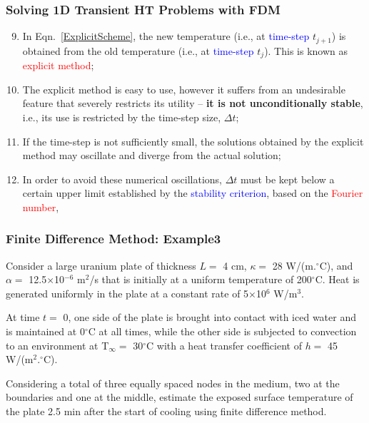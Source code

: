 \documentclass[10pt,compress,unknownkeysallowed]{beamer}
\newcommand{\frc}{\displaystyle\frac}
\newcommand{\red}{\textcolor{red}}
\newcommand{\blue}{\textcolor{blue}}
\begin{document}
\begin{frame}
  \frametitle{Solving 1D Transient HT Problems with FDM}
    \begin{enumerate}\setcounter{enumi}{8}
      \item<1-> In Eqn.~\ref{ExplicitScheme}, the new temperature (i.e., at \blue{time-step} $t_{j+1}$) is obtained from the old temperature  (i.e., at \blue{time-step} $t_{j}$). This is known as \red{explicit method}; 
      \item<2-> The explicit method is easy to use, however it suffers from an undesirable feature that severely restricts its utility -- {\bf it is not unconditionally stable}, i.e., its use is restricted by the time-step size, $\Delta t$;
      \item<3-> If the time-step is not sufficiently small, the solutions obtained by the explicit method may oscillate and diverge from the actual solution;
      \item<4-> In order to avoid these numerical oscillations, $\Delta t$ must be kept below a certain upper limit established by the \blue{stability criterion}, based on the \red{Fourier number},
           \visible<4->{\begin{equation}
               Fo = \frc{\alpha \Delta t}{\left(\Delta x\right)^{2}} \leq \frc{1}{2}
           \end{equation}} 

    \end{enumerate}
\end{frame}



\begin{frame}
   \frametitle{Finite Difference Method: Example3}
   Consider a large uranium plate of thickness $L=$ 4 cm, $\kappa =$ 28 W/(m.$^{\circ}$C), and $\alpha =$ 12.5$\times$10$^{-6}$ m$^{2}$/s that is initially at a uniform temperature of 200$^{\circ}$C. Heat is generated uniformly in the plate at a constant rate of 5$\times$10$^{6}$ W/m$^{3}$. 
\medskip

At time $t=$ 0, one side of the plate is brought into contact with iced water and is maintained at 0$^{\circ}$C at all times, while the other side is subjected to convection to an environment at T$_{\infty}=$ 30$^{\circ}$C with a heat transfer coefficient of $h=$ 45 W/(m$^{2}.^{\circ}$C).  
\medskip

Considering a total of three equally spaced nodes in the medium, two at the boundaries and one at the middle, estimate the exposed surface temperature of the plate 2.5 min after the start of cooling using finite difference method.

\end{frame}
\end{document}
